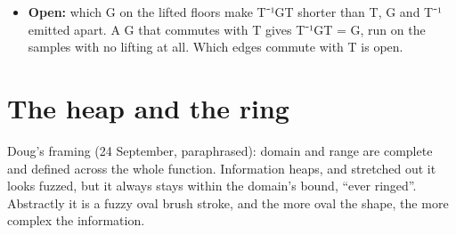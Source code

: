 \begin{itemize}
\begin{itemize}
\item An edge permutes the low k bits of a coefficient through a table π (k ≤ 20) and passes its high bits.
\item For every integer v: E(v) = (v − AND(v, 2\textasciicircum{}k − 1)) + TABLE\_\allowbreak{}π(AND(v, 2\textasciicircum{}k − 1)).
\item The and is v's residue, never negative and k bits wide, and the table step indexes by it. v less its residue has k low zero bits, and the sum puts π's value in them. For a 32-bit word it agrees with the kernel's (word \& \textasciitilde{}mask) | π(word \& mask).
\item E is a bijection of the integers. T⁻¹ET is a bijection of the samples with inverse T⁻¹E⁻¹T. An edge on level ℓ's highs costs ℓ levels each way.
\item An edge moves a coefficient by less than 2\textasciicircum{}k. A wrap placed after an edge needs its bound raised by 2\textasciicircum{}k, or it is silently wrong.
\end{itemize}
\item \textbf{Open:} which G on the lifted floors make T⁻¹GT shorter than T, G and T⁻¹ emitted apart. A G that commutes with T gives T⁻¹GT = G, run on the samples with no lifting at all. Which edges commute with T is open.
\end{itemize}

\section{\texorpdfstring{The heap and the ring}{The heap and the ring}}

Doug's framing (24 September, paraphrased): domain and range are complete and defined across the whole function. Information heaps, and stretched out it looks fuzzed, but it always stays within the domain's bound, “ever ringed”. Abstractly it is a fuzzy oval brush stroke, and the more oval the shape, the more complex the information.

